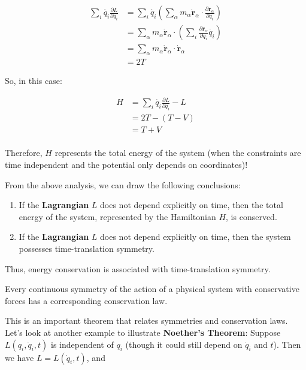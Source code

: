 \begin{align}
    \sum_i \dot{q_i} \frac{\partial L}{\partial \dot{q_i}} &= \sum_i \dot{q_i} \left(\sum_\alpha m_\alpha \dot{\mathbf{r}}_\alpha \cdot \frac{\partial \mathbf{r}_\alpha}{\partial q_i}\right) \\
    &= \sum_\alpha m_\alpha \dot{\mathbf{r}}_\alpha \cdot \left(\sum_i \frac{\partial \mathbf{r}_\alpha}{\partial q_i} \dot{q_i}\right) \\
    &= \sum_\alpha m_\alpha \dot{\mathbf{r}}_\alpha \cdot \dot{\mathbf{r}}_\alpha \\
    &= 2T
\end{align}

So, in this case:

\begin{align}
    H &= \sum_i \dot{q_i} \frac{\partial L}{\partial \dot{q_i}} - L \\
    &= 2T - \left(T - V\right) \\
    &= T + V \\
\end{align}

Therefore, $H$ represents the total energy of the system (when the constraints are time independent and the potential only depends on coordinates)!

From the above analysis, we can draw the following conclusions:

\begin{enumerate}
    \item If the \textbf{Lagrangian} $L$ does not depend explicitly on time, then the total energy of the system, represented by the Hamiltonian $H$, is conserved.
    \item If the \textbf{Lagrangian} $L$ does not depend explicitly on time, then the system possesses time-translation symmetry.
\end{enumerate}

Thus, energy conservation is associated with time-translation symmetry.

\begin{definition}
 Every continuous symmetry of the action of a physical system with conservative forces has a corresponding conservation law.
\end{definition}

This is an important theorem that relates symmetries and conservation laws.
Let's look at another example to illustrate \textbf{Noether's Theorem}: Suppose 
$L(q_i, \dot{q}_i, t)$ is independent of $q_i$ (though it could still depend on 
$\dot{q}_i$ and $t$). Then we have $L = L(\dot{q}_i, t)$, and


